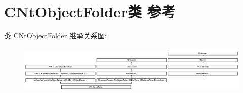 \hypertarget{class_c_nt_object_folder}{}\section{C\+Nt\+Object\+Folder类 参考}
\label{class_c_nt_object_folder}
类 C\+Nt\+Object\+Folder 继承关系图\+:\begin{figure}[H]
\begin{center}
\leavevmode
\includegraphics[height=2.372881cm]{class_c_nt_object_folder}
\end{center}
\end{figure}
